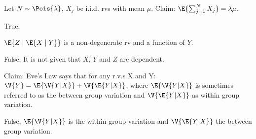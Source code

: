 \documentclass[tf-tutorial-all.tex]{subfiles}
\begin{document}
\begin{truefalse}
Let $N \sim \Pois{\lambda}$, $X_j$ be i.i.d. rvs with mean $\mu$. Claim: $\E{\sum_{j=1}^NX_j}=\lambda\mu$.

\begin{solution}
True.
\end{solution}
\end{truefalse}

\begin{truefalse}
$\E{Z \mid \E{X \mid Y}}$ is a non-degenerate rv and a function of $Y$.
\begin{solution}
False. It is not given that $X$, $Y$ and $Z$ are dependent. 
\end{solution}
\end{truefalse}

\begin{truefalse}
Claim:
Eve's Law says that for any r.v.s X and Y:
$ \V{Y} = \E{\V{Y|X}} + \V{\E{Y|X}}$, where $\E{\V{Y|X}}$ is sometimes referred to as the between group variation and $\V{\E{Y|X}}$ as within group variation.
\begin{solution}
False, $\E{\V{Y|X}}$ is the within group variation and $\V{\E{Y|X}}$ the between group variation.
\end{solution}
\end{truefalse}
\end{document}
